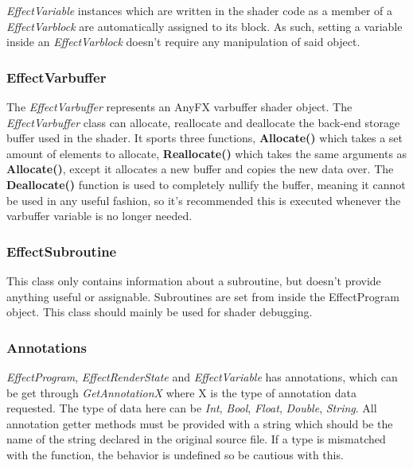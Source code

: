 \documentclass{article}
\begin{document}
\textit{EffectVariable} instances which are written in the shader code as a member of a \textit{EffectVarblock} are automatically assigned to its block. As such, setting a variable inside an \textit{EffectVarblock} doesn't require any manipulation of said object. 

\subsubsection{EffectVarbuffer}
The \textit{EffectVarbuffer} represents an AnyFX varbuffer shader object. The \textit{EffectVarbuffer} class can allocate, reallocate and deallocate the back-end storage buffer used in the shader. It sports three functions, \textbf{Allocate()} which takes a set amount of elements to allocate, \textbf{Reallocate()} which takes the same arguments as \textbf{Allocate()}, except it allocates a new buffer and copies the new data over. The \textbf{Deallocate()} function is used to completely nullify the buffer, meaning it cannot be used in any useful fashion, so it's recommended this is executed whenever the varbuffer variable is no longer needed.  

\subsubsection{EffectSubroutine}
This class only contains information about a subroutine, but doesn't provide anything useful or assignable. Subroutines are set from inside the EffectProgram object. This class should mainly be used for shader debugging.

\subsubsection{Annotations}
\textit{EffectProgram}, \textit{EffectRenderState} and \textit{EffectVariable} has annotations, which can be get through \textit{GetAnnotationX} where X is the type of annotation data requested. The type of data here can be \textit{Int}, \textit{Bool}, \textit{Float}, \textit{Double}, \textit{String}. All annotation getter methods must be provided with a string which should be the name of the string declared in the original source file. If a type is mismatched with the function, the behavior is undefined so be cautious with this. 
\end{document}
